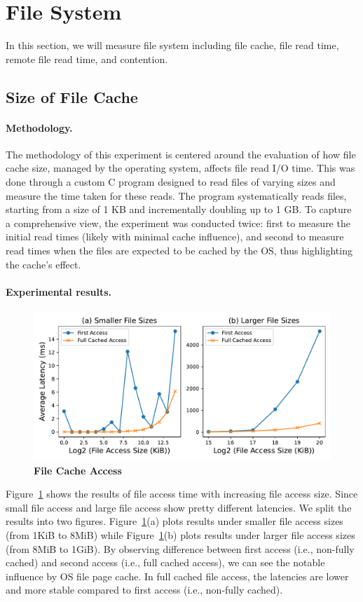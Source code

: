 \section{File System}
\label{sec:file}
In this section, we will measure file system including file cache, file read time, remote file read time, and contention.

\subsection{Size of File Cache}
\paragraph{Methodology.}
The methodology of this experiment is centered around the evaluation of how file cache size, managed by the operating system, affects file read I/O time. This was done through a custom C program designed to read files of varying sizes and measure the time taken for these reads. The program systematically reads files, starting from a size of 1 KB and incrementally doubling up to 1 GB. To capture a comprehensive view, the experiment was conducted twice: first to measure the initial read times (likely with minimal cache influence), and second to measure read times when the files are expected to be cached by the OS, thus highlighting the cache's effect. 

\paragraph{Experimental results.}
\begin{figure}[t]
	\centering
	\includegraphics[width=0.98\linewidth]{sourcecode/file/filecache.pdf}
	\caption{\label{fig:file_cache} \textbf{File Cache Access}}
\end{figure}
Figure~\ref{fig:file_cache} shows the results of file access time with increasing file access size. Since small file access and large file access show pretty different latencies. We split the results into two figures. Figure~\ref{fig:file_cache}(a) plots results under smaller file access sizes (from 1KiB to 8MiB) while Figure~\ref{fig:file_cache}(b) plots results under larger file access sizes (from 8MiB to 1GiB). By observing difference between first access (i.e., non-fully cached) and second access (i.e., full cached access), we can see the notable influence by OS file page cache. In full cached file access, the latencies are lower and more stable compared to first access (i.e., non-fully cached).

